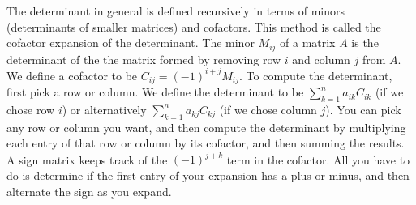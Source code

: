 The determinant in general is defined recursively in terms of minors (determinants of smaller matrices) and cofactors. 
This method is called the cofactor expansion of the determinant. 
The minor {$M_{ij}$} of a matrix {$A$} is the determinant of the the matrix formed by removing row {$i$} and column {$j$} from {$A$}.  
We define a cofactor to be {$C_{ij} = (-1)^{i+j}M_{ij}$}.  
To compute the determinant, first pick a row or column.
We define the determinant to be $\sum_{k=1}^n a_{ik}C_{ik}$ (if we chose row $i$) or alternatively $\sum_{k=1}^n a_{kj}C_{kj}$ (if we chose column $j$). 
You can pick any row or column you want, and then compute the determinant by multiplying each entry of that row or column by its cofactor, and then summing the results.  
A sign matrix keeps track of the $(-1)^{j+k}$ term in the cofactor. All you have to do is determine if the first entry of your expansion has a plus or minus, and then alternate the sign as you expand.
